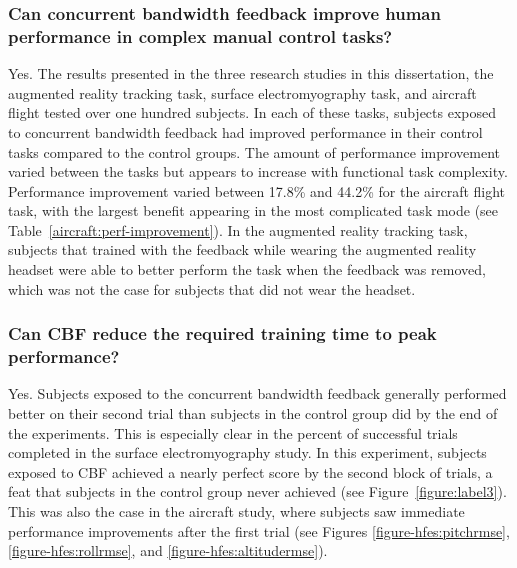 \subsubsection{Can concurrent bandwidth feedback improve human performance in complex manual control tasks?}
Yes.
The results presented in the three research studies in this dissertation, the augmented reality tracking task, surface electromyography task, and aircraft flight tested over one hundred subjects.
In each of these tasks, subjects exposed to concurrent bandwidth feedback had improved performance in their control tasks compared to the control groups.
The amount of performance improvement varied between the tasks but appears to increase with functional task complexity.
Performance improvement varied between 17.8\% and 44.2\% for the aircraft flight task, with the largest benefit appearing in the most complicated task mode (see Table~\ref{aircraft:perf-improvement}).
In the augmented reality tracking task, subjects that trained with the feedback while wearing the augmented reality headset were able to better perform the task when the feedback was removed, which was not the case for subjects that did not wear the headset.

\subsubsection{Can CBF reduce the required training time to peak performance?}
Yes.
Subjects exposed to the concurrent bandwidth feedback generally performed better on their second trial than subjects in the control group did by the end of the experiments.
This is especially clear in the percent of successful trials completed in the surface electromyography study.
In this experiment, subjects exposed to CBF achieved a nearly perfect score by the second block of trials, a feat that subjects in the control group never achieved (see Figure~\ref{figure:label3}).
This was also the case in the aircraft study, where subjects saw immediate performance improvements after the first trial (see Figures \ref{figure-hfes:pitchrmse}, \ref{figure-hfes:rollrmse}, and \ref{figure-hfes:altitudermse}).

